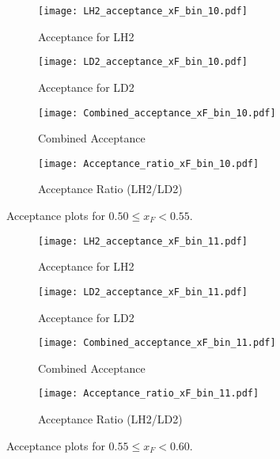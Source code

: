 \documentclass{article}
\begin{document}
\begin{figure}[H]
    \centering
    \begin{subfigure}[b]{0.48\textwidth}
       \texttt{[image: LH2\_acceptance\_xF\_bin\_10.pdf]}
       \caption{Acceptance for LH2}
    \end{subfigure}
    \hfill
    \begin{subfigure}[b]{0.48\textwidth}
       \texttt{[image: LD2\_acceptance\_xF\_bin\_10.pdf]}
       \caption{Acceptance for LD2}
    \end{subfigure}

    \begin{subfigure}[b]{0.48\textwidth}
       \texttt{[image: Combined\_acceptance\_xF\_bin\_10.pdf]}
       \caption{Combined Acceptance}
    \end{subfigure}
    \hfill
    \begin{subfigure}[b]{0.48\textwidth}
       \texttt{[image: Acceptance\_ratio\_xF\_bin\_10.pdf]}
       \caption{Acceptance Ratio (LH2/LD2)}
    \end{subfigure}
    \caption{Acceptance plots for $0.50 \le x_F < 0.55$.}
\end{figure}

\begin{figure}[H]
    \centering
    \begin{subfigure}[b]{0.48\textwidth}
       \texttt{[image: LH2\_acceptance\_xF\_bin\_11.pdf]}
       \caption{Acceptance for LH2}
    \end{subfigure}
    \hfill
    \begin{subfigure}[b]{0.48\textwidth}
       \texttt{[image: LD2\_acceptance\_xF\_bin\_11.pdf]}
       \caption{Acceptance for LD2}
    \end{subfigure}

    \begin{subfigure}[b]{0.48\textwidth}
       \texttt{[image: Combined\_acceptance\_xF\_bin\_11.pdf]}
       \caption{Combined Acceptance}
    \end{subfigure}
    \hfill
    \begin{subfigure}[b]{0.48\textwidth}
       \texttt{[image: Acceptance\_ratio\_xF\_bin\_11.pdf]}
       \caption{Acceptance Ratio (LH2/LD2)}
    \end{subfigure}
    \caption{Acceptance plots for $0.55 \le x_F < 0.60$.}
\end{figure}
\end{document}
